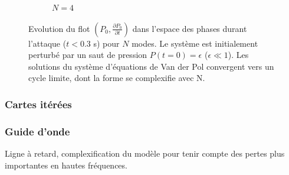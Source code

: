 \begin{figure}
\begin{subfigure}[b]{.24\linewidth}
        \caption{$N=4$}
        \label{fig:VDP_phase_N4}
    \end{subfigure}
    \caption{Evolution du flot $(P_0,\frac{\partial P_0}{\partial t})$ dans l'espace des phases durant l'attaque ($t<0.3$ s) pour $N$ modes. Le système est initialement perturbé par un saut de pression $P(t=0)=\epsilon$ ($\epsilon \ll 1$). Les solutions du système d'équations de Van der Pol convergent vers un cycle limite, dont la forme se complexifie avec N.}
    \label{fig:VDP_phase}
\end{figure}


\subsubsection{Cartes itérées}

\subsubsection{Guide d'onde}

Ligne à retard, complexification du modèle pour tenir compte des pertes plus importantes en hautes fréquences.